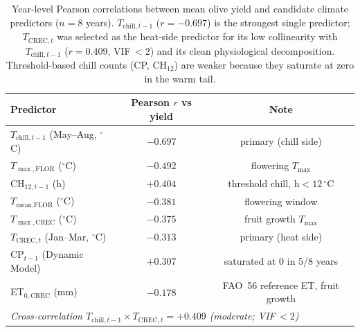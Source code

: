 \begin{table}[H]
\caption{Year-level Pearson correlations between mean olive yield and candidate
climate predictors ($n=8$ years). $T_{\text{chill},t-1}$ ($r=-0.697$) is the
strongest single predictor; $T_{\text{CREC},t}$ was selected as the heat-side
predictor for its low collinearity with $T_{\text{chill},t-1}$ ($r=0.409$,
VIF\,$<2$) and its clean physiological decomposition. Threshold-based chill
counts (CP, CH$_{12}$) are weaker because they saturate at zero in the warm tail.\label{tab:year_corr}}
\centering
\small
\begin{tabular}{lcc}
\toprule
\textbf{Predictor} & \textbf{Pearson $r$ vs yield} & \textbf{Note} \\
\midrule
$T_{\text{chill},t-1}$ (May--Aug, $^\circ$C)     & $\mathbf{-0.697}$ & primary (chill side) \\
$T_{\max,\text{FLOR}}$ ($^\circ$C)               & $-0.492$ & flowering $T_{\max}$ \\
CH$_{12,t-1}$ (h)                                & $+0.404$ & threshold chill, h$<12\,^\circ$C \\
$T_{\text{mean},\text{FLOR}}$ ($^\circ$C)        & $-0.381$ & flowering window \\
$T_{\max,\text{CREC}}$ ($^\circ$C)               & $-0.375$ & fruit growth $T_{\max}$ \\
$T_{\text{CREC},t}$ (Jan--Mar, $^\circ$C)        & $\mathbf{-0.313}$ & primary (heat side) \\
CP$_{t-1}$ (Dynamic Model)                       & $+0.307$ & saturated at 0 in 5/8 years \\
ET$_{0,\text{CREC}}$ (mm)                        & $-0.178$ & FAO~56 reference ET, fruit growth \\
\midrule
\multicolumn{3}{l}{\textit{Cross-correlation $T_{\text{chill},t-1}\times T_{\text{CREC},t}=+0.409$ (moderate; VIF\,$<2$)}} \\
\bottomrule
\end{tabular}
\end{table}
